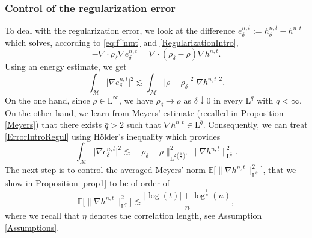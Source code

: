 \documentclass[11pt,a4paper,oneside]{amsart}
\numberwithin{equation}{section}
\newcommand{\LL}{\mathrm{L}}
\begin{document}
\subsubsection*{Control of the regularization error}To deal with the regularization error, we look at the difference $e^{n,t}_\delta:=h^{n,t}_\delta-h^{n,t}$ which solves, according to \eqref{eq:f^nmt} and \eqref{RegularizationIntro},
%
\begin{equation}\label{ErrorEquation}
%
-\nabla\cdot\rho_\delta\nabla e^{n,t}_\delta=\nabla\cdot(\rho_\delta-\rho)\nabla h^{n,t}.
%
\end{equation}
%
Using an energy estimate, we get
%
\begin{equation}\label{ErrorIntroRegul}
%
\int_{\mathcal{M}}\vert\nabla e^{n,t}_\delta\vert^2\lesssim \int_{\mathcal{M}}\vert\rho-\rho_\delta\vert^2\vert\nabla h^{n,t}\vert^2.
%
\end{equation}
%
On the one hand, since $\rho\in \LL^\infty$, we have $\rho_\delta\rightarrow\rho$ as $\delta\downarrow 0$ in every $\LL^q$ with $q<\infty$. On the other hand, we learn from Meyers' estimate (recalled in Proposition \ref{Meyers}) that there exists $\bar q>2$ such that $\nabla h^{n,t}\in \LL^{\bar q}$. Consequently, we can treat \eqref{ErrorIntroRegul} using H\"older's inequality which provides
%
\begin{equation}\label{LqControlIntro}
%
\int_{\mathcal{M}}\vert\nabla e^{n,t}_\delta\vert^2\lesssim\|\rho_\delta-\rho\|^2_{\LL^{2(\frac{\bar{q}}{2})'}}\|\nabla h^{n,t}\|^2_{\LL^{\bar{q}}}.
%
\end{equation}
%
The next step is to control the averaged Meyers' norm $\mathbb{E}\big[\|\nabla h^{n,t}\|^2_{\LL^{\bar{q}}}\big]$, that we show in Proposition \ref{prop1} to be of order of 
%
\begin{equation}\label{LqEstimatesIntro}
%
\mathbb{E}\big[\|\nabla h^{n,t}\|^2_{\LL^{\bar{q}}}\big]\lesssim \frac{\vert\log(t)\vert+\log^{\frac{1}{\eta}}(n)}{n},
%
\end{equation} 
%
where we recall that $\eta$ denotes the correlation length, see Assumption \ref{Assumptions}. 

%
\medskip
%
\end{document}
